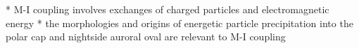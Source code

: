 
* M-I coupling involves exchanges of charged particles and
electromagnetic energy
* the morphologies and origins of energetic
particle precipitation into the polar cap and nightside auroral oval are
relevant to M-I coupling
